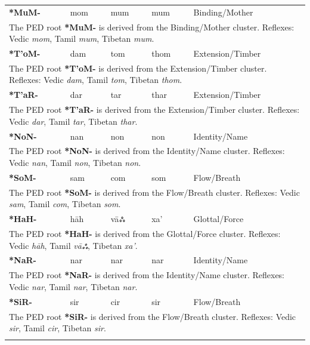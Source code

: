 \begin{longtable}{p{} p{} p{} p{} p{}}
\textbf{*MuM-} & mom & mum & mum & Binding/Mother \\ 
\multicolumn{5}{p{\textwidth}}{\small The PED root \textbf{*MuM-} is derived from the Binding/Mother cluster. Reflexes: Vedic \textit{mom}, Tamil \textit{mum}, Tibetan \textit{mum}. } \\ \addlinespace 
\textbf{*T'oM-} & dam & tom & thom & Extension/Timber \\ 
\multicolumn{5}{p{\textwidth}}{\small The PED root \textbf{*T'oM-} is derived from the Extension/Timber cluster. Reflexes: Vedic \textit{dam}, Tamil \textit{tom}, Tibetan \textit{thom}. } \\ \addlinespace 
\textbf{*T'aR-} & dar & tar & thar & Extension/Timber \\ 
\multicolumn{5}{p{\textwidth}}{\small The PED root \textbf{*T'aR-} is derived from the Extension/Timber cluster. Reflexes: Vedic \textit{dar}, Tamil \textit{tar}, Tibetan \textit{thar}. } \\ \addlinespace 
\textbf{*NoN-} & nan & non & non & Identity/Name \\ 
\multicolumn{5}{p{\textwidth}}{\small The PED root \textbf{*NoN-} is derived from the Identity/Name cluster. Reflexes: Vedic \textit{nan}, Tamil \textit{non}, Tibetan \textit{non}. } \\ \addlinespace 
\textbf{*SoM-} & sam & com & som & Flow/Breath \\ 
\multicolumn{5}{p{\textwidth}}{\small The PED root \textbf{*SoM-} is derived from the Flow/Breath cluster. Reflexes: Vedic \textit{sam}, Tamil \textit{com}, Tibetan \textit{som}. } \\ \addlinespace 
\textbf{*HaH-} & hāh & vāஃ & xa' & Glottal/Force \\ 
\multicolumn{5}{p{\textwidth}}{\small The PED root \textbf{*HaH-} is derived from the Glottal/Force cluster. Reflexes: Vedic \textit{hāh}, Tamil \textit{vāஃ}, Tibetan \textit{xa'}. } \\ \addlinespace 
\textbf{*NaR-} & nar & nar & nar & Identity/Name \\ 
\multicolumn{5}{p{\textwidth}}{\small The PED root \textbf{*NaR-} is derived from the Identity/Name cluster. Reflexes: Vedic \textit{nar}, Tamil \textit{nar}, Tibetan \textit{nar}. } \\ \addlinespace 
\textbf{*SiR-} & sir & cir & sir & Flow/Breath \\ 
\multicolumn{5}{p{\textwidth}}{\small The PED root \textbf{*SiR-} is derived from the Flow/Breath cluster. Reflexes: Vedic \textit{sir}, Tamil \textit{cir}, Tibetan \textit{sir}. } \\ \addlinespace 

\end{longtable}
